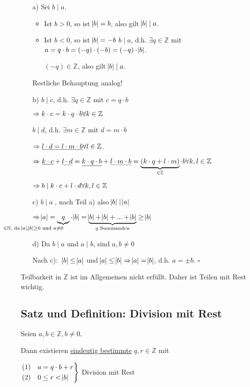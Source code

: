 \documentclass[a4paper, 12pt, twoside] {article}
\begin{document}
\begin{itemize}

\item[a)] Sei $b \mid a$.

	\begin{itemize}
	\item Ist $b > 0$, so ist $\abs{b} = b$, also gilt $\abs{b} \mid a$.
	
	\item Ist $b < 0$, so ist $\abs{b} = -b$
		$b \mid a$, d.h. $\exists q \in \mathbb{Z}$ mit $a = q \cdot b = (-q) \cdot (-b) = (-q) \cdot \abs{b}$.
		
		$(-q) \in \mathbb{Z}$, also gilt $\abs{b} \mid a$.

	\end{itemize}
	
	Restliche Behauptung analog!
	
\item[b)] $b \mid c$, d.h. $\exists q \in \mathbb{Z}$ mit $c = q \cdot b$

$\Rightarrow k \cdot c = k \cdot q \cdot b \hfill \forall k \in \mathbb{Z}$

$b \mid d$, d.h. $\exists m \in \mathbb{Z}$ mit $d = m \cdot b$

$\Rightarrow \underline{l \cdot d = l \cdot m \cdot b} \hfill \forall l \in \mathbb{Z}$.

$\Rightarrow \uline{k\cdot c} + \uwave{l \cdot d} = \uline{k \cdot q \cdot b} + \uwave{l \cdot m \cdot b} = \underbrace{(k \cdot q + l \cdot m)}_{\in \mathbb{Z}} \cdot b \hfill \forall k,l \in \mathbb{Z}$

$\Rightarrow b \mid k \cdot c + l \cdot d \hfill \forall k,l \in \mathbb{Z}$

\item[c)] $b \mid a \;$, nach Teil a) also $\abs{b} \mid \abs{a}$

$\Rightarrow \abs{a} = \underbrace{q}_{\mathllap{\in \mathbb{N} \text{, da } \abs{a},\abs{b} \geq 0 \text{ und } a \neq 0}} \cdot \abs{b} = \underbrace{\abs{b} + \abs{b} + ... + \abs{b}}_{q \text{ Summanden}} \geq \abs{b}$

\item[d)] Da $b \mid a$ und $a \mid b$, sind $a,b \neq 0$

Nach c): $\ \abs{b} \leq \abs{a}$ und $\abs{a} \leq \abs{b} \Rightarrow \abs{a} = \abs{b}$, d.h. $a = \pm b$. \hfill $\square$

\end{itemize}

Teilbarkeit in $\mathbb{Z}$ ist im Allgemeinen nicht erfüllt. Daher ist Teilen mit Rest wichtig.

\subsection{Satz und Definition: Division mit Rest}

Seien $a,b \in \mathbb{Z}, b \neq 0$.

Dann existieren \uline{eindeutig bestimmte} $q,r \in \mathbb{Z}$ mit

$\begin{rcases}
(1) & a = q \cdot b + r \\
(2) & 0 \leq r < \abs{b}
\end{rcases}$ Division mit Rest
\end{document}
